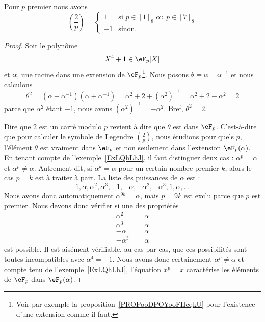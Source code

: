 \begin{proposition}
	Pour \( p\) premier nous avons
	\begin{equation}
		\left(\frac{2}{p}\right)=\begin{cases}
			1  & \text{si } p\in [1]_8\text{ ou } p\in [7]_8 \\
			-1 & \text{sinon}.
		\end{cases}
	\end{equation}
\end{proposition}

\begin{proof}
	Soit le polynôme
	\begin{equation}
		X^4+1\in \eF_p[X]
	\end{equation}
	et \( \alpha\), une racine dans une extension de \( \eF_p\)\footnote{Voir par exemple la proposition~\ref{PROPooDPOYooFHcqkU} pour l'existence d'une extension comme il faut.}. Nous posons \( \theta=\alpha+\alpha^{-1}\) et nous calculons
	\begin{equation}
		\theta^2=(\alpha+\alpha^{-1})(\alpha+\alpha^{-1})=\alpha^2+2+(\alpha^2)^{-1}=\alpha^2+2-\alpha^2=2
	\end{equation}
	parce que \( \alpha^2\) étant \( -1\), nous avons \( (\alpha^2)^{-1}=-\alpha^2\). Bref, \( \theta^2=2\).

	Dire que \( 2\) est un carré modulo \( p\) revient à dire que \( \theta\) est dans \( \eF_p\). C'est-à-dire que pour calculer le symbole de Legendre \( \left(\frac{2}{p}\right)\), nous étudions pour quels \( p\), l'élément \( \theta\) est vraiment dans \( \eF_p\) et non seulement dans l'extension \( \eF_p(\alpha)\). En tenant compte de l'exemple~\ref{ExLQhLhJ}, il faut distinguer deux cas : \( \alpha^p=\alpha\) et \( \alpha^p\neq \alpha\). Autrement dit, si \( \alpha^k=\alpha\) pour un certain nombre premier \( k\), alors le cas \( p=k\) est à traiter à part. La liste des puissances de \( \alpha\) est :
	\begin{equation}
		1,\alpha,\alpha^2,\alpha^3,-1,-\alpha,-\alpha^2,-\alpha^3,1,\alpha,\ldots
	\end{equation}
	Nous avons donc automatiquement \( \alpha^{9k}=\alpha\), mais \( p=9k\) est exclu parce que \( p\) est premier. Nous devons donc vérifier si une des propriétés
	\begin{subequations}
		\begin{align}
			\alpha^2  & =\alpha \\
			\alpha^3  & =\alpha \\
			-\alpha   & =\alpha \\
			-\alpha^3 & =\alpha
		\end{align}
	\end{subequations}
	est possible. Il est aisément vérifiable, au cas par cas, que ces possibilités sont toutes incompatibles avec \( \alpha^4=-1\). Nous avons donc certainement \( \alpha^p\neq \alpha\) et compte tenu de l'exemple~\ref{ExLQhLhJ}, l'équation \( x^p=x\) caractérise les éléments de \( \eF_p\) dans \( \eF_p(\alpha)\).


\end{proof}
